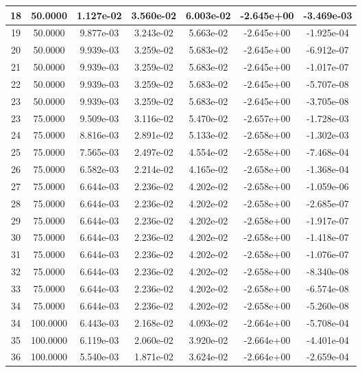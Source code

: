 \documentclass[10pt]{report}
\begin{document}
\begin{table}[H]
\begin{center}
\begin{tabular}{|c|c|c|c|c|c|c|}
18 & 50.0000 & 1.127e-02 & 3.560e-02 & 6.003e-02 & -2.645e+00 & -3.469e-03\\ \hline
19 & 50.0000 & 9.877e-03 & 3.243e-02 & 5.663e-02 & -2.645e+00 & -1.925e-04\\ \hline
20 & 50.0000 & 9.939e-03 & 3.259e-02 & 5.683e-02 & -2.645e+00 & -6.912e-07\\ \hline
21 & 50.0000 & 9.939e-03 & 3.259e-02 & 5.683e-02 & -2.645e+00 & -1.017e-07\\ \hline
22 & 50.0000 & 9.939e-03 & 3.259e-02 & 5.683e-02 & -2.645e+00 & -5.707e-08\\ \hline
23 & 50.0000 & 9.939e-03 & 3.259e-02 & 5.683e-02 & -2.645e+00 & -3.705e-08\\ \hline
23 & 75.0000 & 9.509e-03 & 3.116e-02 & 5.470e-02 & -2.657e+00 & -1.728e-03\\ \hline
24 & 75.0000 & 8.816e-03 & 2.891e-02 & 5.133e-02 & -2.658e+00 & -1.302e-03\\ \hline
25 & 75.0000 & 7.565e-03 & 2.497e-02 & 4.554e-02 & -2.658e+00 & -7.468e-04\\ \hline
26 & 75.0000 & 6.582e-03 & 2.214e-02 & 4.165e-02 & -2.658e+00 & -1.368e-04\\ \hline
27 & 75.0000 & 6.644e-03 & 2.236e-02 & 4.202e-02 & -2.658e+00 & -1.059e-06\\ \hline
28 & 75.0000 & 6.644e-03 & 2.236e-02 & 4.202e-02 & -2.658e+00 & -2.685e-07\\ \hline
29 & 75.0000 & 6.644e-03 & 2.236e-02 & 4.202e-02 & -2.658e+00 & -1.917e-07\\ \hline
30 & 75.0000 & 6.644e-03 & 2.236e-02 & 4.202e-02 & -2.658e+00 & -1.418e-07\\ \hline
31 & 75.0000 & 6.644e-03 & 2.236e-02 & 4.202e-02 & -2.658e+00 & -1.076e-07\\ \hline
32 & 75.0000 & 6.644e-03 & 2.236e-02 & 4.202e-02 & -2.658e+00 & -8.340e-08\\ \hline
33 & 75.0000 & 6.644e-03 & 2.236e-02 & 4.202e-02 & -2.658e+00 & -6.574e-08\\ \hline
34 & 75.0000 & 6.644e-03 & 2.236e-02 & 4.202e-02 & -2.658e+00 & -5.260e-08\\ \hline
34 & 100.0000 & 6.443e-03 & 2.168e-02 & 4.093e-02 & -2.664e+00 & -5.708e-04\\ \hline
35 & 100.0000 & 6.119e-03 & 2.060e-02 & 3.920e-02 & -2.664e+00 & -4.401e-04\\ \hline
36 & 100.0000 & 5.540e-03 & 1.871e-02 & 3.624e-02 & -2.664e+00 & -2.659e-04\\ \hline

\end{tabular}
\end{center}
\end{table}
\end{document}
